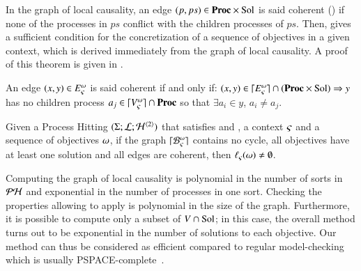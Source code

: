 In the graph of local causality, an edge $(p, ps) \in \mathbf{Proc} \times \mathrm{Sol}$ %
is said coherent () if none of the processes in $ps$ conflict with the children processes of $ps$.
Then,  gives a sufficient condition for the concretization of a sequence of objectives in a given context,
which is derived immediately from the graph of local causality.
A proof of this theorem is given in .
\begin{definition}
\label{def:coherent}
  An edge $(x, y) \in E_\varsigma^\omega$ is said coherent if and only if:
  $(x, y) \in \lceil E_\varsigma^\omega\rceil \cap (\mathbf{Proc} \times \mathrm{Sol}) \Rightarrow y$ has no children process $a_j \in \lceil V_\varsigma^\omega\rceil \cap \mathbf{Proc}$ so that $\exists a_i \in y$, $a_i \neq a_j$.
\end{definition}

\begin{theorem}
\label{th:approxinf}
Given a Process Hitting $(\Sigma; \mathcal{L}; \mathcal{H}^{\langle 2 \rangle})$
that satisfies  and ,
a context $\varsigma$ and a sequence of objectives $\omega$,
  if the graph $\lceil \mathcal{B}_\varsigma^\omega\rceil$ contains no cycle,
  all objectives have at least one solution
  and all edges are coherent,
  then $\ell_\varsigma(\omega) \neq \emptyset$.
\end{theorem}

Computing the graph of local causality is polynomial in the number of sorts in $\mathcal{PH}$ and exponential in the number of processes in one sort.
Checking the properties allowing to apply  is polynomial in the size of the graph.
Furthermore, it is possible to compute only a subset of $V \cap \mathrm{Sol}$;
in this case, the overall method turns out to be exponential in the number of solutions to each objective.
Our method can thus be considered as efficient compared to regular model-checking which is usually PSPACE-complete~\cite{Harel02}.



